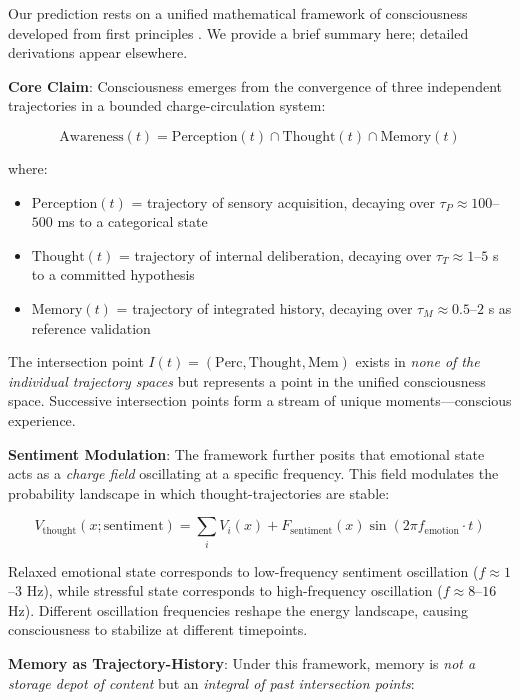 \documentclass[12pt,a4paper]{article}
\theoremstyle{definition}
\begin{document}
Our prediction rests on a unified mathematical framework of consciousness developed from first principles \cite{constituentpaper}. We provide a brief summary here; detailed derivations appear elsewhere.

\textbf{Core Claim}: Consciousness emerges from the convergence of three independent trajectories in a bounded charge-circulation system:

\begin{equation}
\text{Awareness}(t) = \text{Perception}(t) \cap \text{Thought}(t) \cap \text{Memory}(t)
\end{equation}

where:
\begin{itemize}
  \item $\text{Perception}(t)$ = trajectory of sensory acquisition, decaying over $\tau_P \approx 100$--$500$ ms to a categorical state
  \item $\text{Thought}(t)$ = trajectory of internal deliberation, decaying over $\tau_T \approx 1$--$5$ s to a committed hypothesis
  \item $\text{Memory}(t)$ = trajectory of integrated history, decaying over $\tau_M \approx 0.5$--$2$ s as reference validation
\end{itemize}

The intersection point $I(t) = (\text{Perc}, \text{Thought}, \text{Mem})$ exists in \textit{none of the individual trajectory spaces} but represents a point in the unified consciousness space. Successive intersection points form a stream of unique moments---conscious experience.

\textbf{Sentiment Modulation}: The framework further posits that emotional state acts as a \textit{charge field} oscillating at a specific frequency. This field modulates the probability landscape in which thought-trajectories are stable:

\begin{equation}
V_{\text{thought}}(x; \text{sentiment}) = \sum_{i} V_i(x) + F_{\text{sentiment}}(x) \sin(2\pi f_{\text{emotion}} \cdot t)
\end{equation}

Relaxed emotional state corresponds to low-frequency sentiment oscillation ($f \approx 1$--$3$ Hz), while stressful state corresponds to high-frequency oscillation ($f \approx 8$--$16$ Hz). Different oscillation frequencies reshape the energy landscape, causing consciousness to stabilize at different timepoints.

\textbf{Memory as Trajectory-History}: Under this framework, memory is \textit{not a storage depot of content} but an \textit{integral of past intersection points}:
\end{document}
